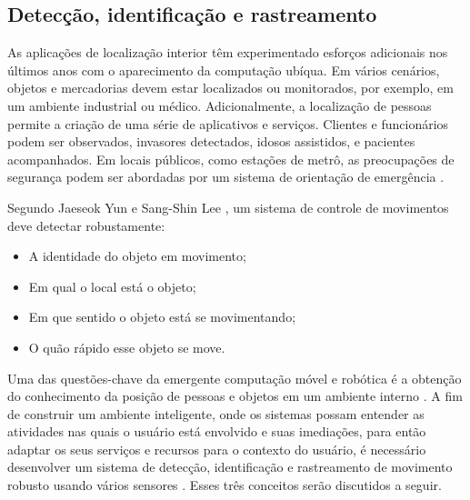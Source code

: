 \subsection{Detecção, identificação e rastreamento}\label{sec:deteccao-rastreamento}

As aplicações de localização interior têm experimentado esforços adicionais nos últimos anos com o aparecimento da computação ubíqua. Em vários cenários, objetos e mercadorias devem estar localizados ou monitorados, por exemplo, em um ambiente industrial ou médico. Adicionalmente, a localização de pessoas permite a criação de uma série de aplicativos e serviços. Clientes e funcionários podem ser observados, invasores detectados, idosos assistidos, e pacientes acompanhados. Em locais públicos, como estações de metrô, as preocupações de segurança podem ser abordadas por um sistema de orientação de emergência \cite{linde2006aspects}. 

Segundo Jaeseok Yun e Sang-Shin Lee \cite{yun2014human}, um sistema de controle de movimentos deve detectar robustamente: 
\begin{itemize}
  \item A identidade do objeto em movimento;
  \item Em qual o local está o objeto; 
  \item Em que sentido o objeto está se movimentando;
  \item O quão rápido esse objeto se move. 
 \end{itemize}

Uma das questões-chave da emergente computação móvel e robótica é a obtenção do conhecimento da posição de pessoas e objetos em um ambiente interno \cite{linde2006aspects}. A fim de construir um ambiente inteligente, onde os sistemas possam entender as atividades nas quais o usuário está envolvido e suas imediações, para então adaptar os seus serviços e recursos para o contexto do usuário, é necessário desenvolver um sistema de detecção, identificação e rastreamento de movimento robusto usando vários sensores \cite{yun2014human}. Esses três conceitos serão discutidos a seguir.


